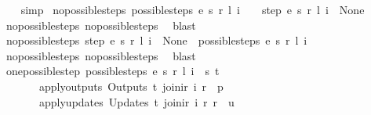 \begin{isabellebody}
\ \ \isamarkupfalse%
\ simp%
\endisatagproof
{\isafoldproof}%
%
\isadelimproof
\isanewline
%
\endisadelimproof
\isanewline
{}\isamarkupfalse%
\ no{\isacharunderscore}possible{\isacharunderscore}steps{\isacharunderscore}{}{\isacharcolon}\ {\isachardoublequoteopen}{\isacharparenleft}possible{\isacharunderscore}steps\ e\ s\ r\ l\ i\ {\isacharequal}\ {\isacharbraceleft}{\isacharbar}{\isacharbar}{\isacharbraceright}{\isacharparenright}\ {\isacharequal}\ {\isacharparenleft}step\ e\ s\ r\ l\ i\ {\isacharequal}\ None{\isacharparenright}{\isachardoublequoteclose}\isanewline
%
\isadelimproof
\ \ %
\endisadelimproof
%
\isatagproof
{}\isamarkupfalse%
\ no{\isacharunderscore}possible{\isacharunderscore}steps{\isacharunderscore}{}\ no{\isacharunderscore}possible{\isacharunderscore}steps{\isacharunderscore}{}\ \isamarkupfalse%
\ blast%
\endisatagproof
{\isafoldproof}%
%
\isadelimproof
\isanewline
%
\endisadelimproof
\isanewline
{}\isamarkupfalse%
\ no{\isacharunderscore}possible{\isacharunderscore}steps{\isacharunderscore}{}{\isacharcolon}\ {\isachardoublequoteopen}{\isacharparenleft}step\ e\ s\ r\ l\ i\ {\isacharequal}\ None{\isacharparenright}\ {\isacharequal}\ {\isacharparenleft}possible{\isacharunderscore}steps\ e\ s\ r\ l\ i\ {\isacharequal}\ {\isacharbraceleft}{\isacharbar}{\isacharbar}{\isacharbraceright}{\isacharparenright}{\isachardoublequoteclose}\isanewline
%
\isadelimproof
\ \ %
\endisadelimproof
%
\isatagproof
{}\isamarkupfalse%
\ no{\isacharunderscore}possible{\isacharunderscore}steps{\isacharunderscore}{}\ no{\isacharunderscore}possible{\isacharunderscore}steps{\isacharunderscore}{}\ \isamarkupfalse%
\ blast%
\endisatagproof
{\isafoldproof}%
%
\isadelimproof
\isanewline
%
\endisadelimproof
\isanewline
{}\isamarkupfalse%
\ one{\isacharunderscore}possible{\isacharunderscore}step{\isacharcolon}\ {\isachardoublequoteopen}possible{\isacharunderscore}steps\ e\ s\ r\ l\ i\ {\isacharequal}\ {\isacharbraceleft}{\isacharbar}{\isacharparenleft}s{\isacharprime}{\isacharcomma}\ t{\isacharparenright}{\isacharbar}{\isacharbraceright}\ {\isasymLongrightarrow}\isanewline
\ \ \ \ \ \ \ apply{\isacharunderscore}outputs\ {\isacharparenleft}Outputs\ t{\isacharparenright}\ {\isacharparenleft}join{\isacharunderscore}ir\ i\ r{\isacharparenright}\ {\isacharequal}\ p\ {\isasymLongrightarrow}\isanewline
\ \ \ \ \ \ \ apply{\isacharunderscore}updates\ {\isacharparenleft}Updates\ t{\isacharparenright}\ {\isacharparenleft}join{\isacharunderscore}ir\ i\ r{\isacharparenright}\ r\ {\isacharequal}\ u\ {\isasymLongrightarrow}\isanewline

\end{isabellebody}
